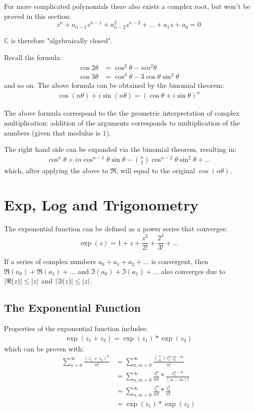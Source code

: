 \documentclass[12pt]{article}
\begin{document}
	For more complicated polynomials there also exists a complex root,  but won't be proved in this section: $$z^n + a_{n-1}z^{n - 1} + a_{n - 2}^2z^{n - 2} + \dots + a_1z + a_0 = 0$$
	
	$\mathbb{C}$ is therefore "algebraically closed".
	
	Recall the formula:
	\begin{align*}
		\cos 2\theta &= \cos^2 \theta - sin^2 \theta \\
		\cos 3\theta &= \cos^3 \theta - 3\cos \theta \sin^2 \theta
	\end{align*}
	and so on. The above formula can be obtained by the binomial theorem:
	\begin{gather*}
		\cos(n\theta) + i\sin(n\theta) = (\cos \theta + i \sin\theta)^n
	\end{gather*}
	
	The above formula correspond to the the geometric interpretation of complex multiplication: addition of the arguments corresponds to multiplication of the numbers (given that modulus is $1$).
	
	The right hand side can be expanded via the binomial theorem, resulting in:
	\begin{gather*}
		\cos^n \theta + in\cos^{n - 1}\theta\sin\theta - \binom{n}{2} \cos^{n - 2}\theta \sin^2 \theta + \dots
	\end{gather*}
	which, after applying the above to $\Re$, will equal to the original $\cos(n\theta)$.
	
	\section{Exp, Log and Trigonometry}
	
	The exponential function can be defined as a power series that converges:
	$$\exp(z) = 1 + z + \frac{z^2}{2!} + \frac{2^3}{3!} + \dots$$
	
	If a series of complex numbers $a_0 + a_1 + a_2 + \dots$ is convergent, then $\Re(a_0) + \Re(a_1) + \dots$ and $\Im(a_0) + \Im(a_1) + \dots$ also converges due to $\lvert \Re(z) \rvert \leq \lvert z \rvert$ and $\lvert \Im(z) \rvert \leq \lvert z \rvert$.
	
	\subsection{The Exponential Function}
	Properties of the exponential function includes:
	\begin{gather*}
		\exp(z_1 + z_2) = \exp(z_1) * \exp(z_2)
	\end{gather*}
	which can be proven with:
	\begin{align*}
		\sum_{n=0}^\infty \frac{(z_1 + z_2)^n}{n!} &= \sum_{n, m=0}^\infty \frac{\binom{n}{m}z_1^m z_2^{n - m}}{n!} \\
		&= \sum_{n, m=0}^\infty \frac{z_1^m}{m!}*\frac{z_2^{n-m}}{(n-m)!} \\
		&= \sum_{n, m=0}^\infty \frac{z_1^m}{m!}*\frac{z_2^n}{n!} \\
		&= \exp(z_1) * \exp(z_2)
	\end{align*}
	
\end{document}
